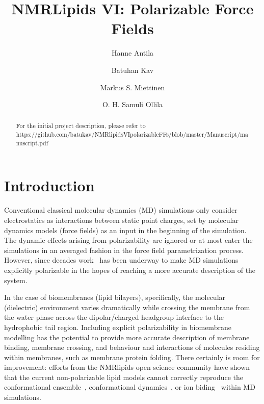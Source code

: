 \documentclass[journal=jacsat,manuscript=article,layout=singlecolumn]{achemso}
\author{Hanne Antila}
\author{Batuhan Kav}
\affiliation{Forschungszentrum Juelich, Germany}
\author{Markus S. Miettinen}
\author{O. H. Samuli Ollila}
\title{NMRLipids VI: Polarizable Force Fields}
\begin{document}


\begin{abstract}
	
	For the initial project description, please refer to \\ https://github.com/batukav/NMRlipidsVIpolarizableFFs/blob/master/Manuscript/manuscript.pdf
	
\end{abstract}

\section{Introduction}
Conventional classical molecular dynamics (MD) simulations only consider electrostatics as interactions between static point charges, set by molecular dynamics models (force fields) as an input in the beginning of the simulation. The dynamic effects arising from polarizability are ignored or at most enter the simulations in an averaged fashion in the force field parametrization process. However, since decades work~\cite{Thole1981,ando2001stable,Grossfield2003,
lamoreux2003,Antila2013 ,Lemkul2016, baker2015polarizable,jing2019polarizable } has been underway to make MD simulations explicitly polarizable in the hopes of reaching a more accurate description of the system. 

In the case of biomembranes (lipid bilayers), specifically, the molecular (dielectric) environment varies dramatically while crossing the membrane from the water phase across the dipolar/charged headgroup interface to the hydrophobic tail region. Including explicit polarizability in biomembrane modelling has the potential to provide more accurate description of membrane binding, membrane crossing, and behaviour and interactions of molecules residing within membranes, such as membrane protein folding. There certainly is room for improvement: efforts from the NMRlipids open science community have shown that the current non-polarizable lipid models cannot correctly reproduce the conformational ensemble~\cite{Botan2015,Antila2019}, conformational dynamics~\cite{Antila2021}, or ion biding~\cite{Catte2016} within MD simulations. 
\end{document}
